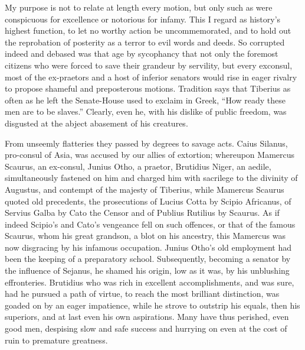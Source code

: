 My purpose is not to relate at length every motion, but only such as were conspicuous for excellence or notorious for infamy. This I regard as history's highest function, to let no worthy action be uncommemorated, and to hold out the reprobation of posterity as a terror to evil words and deeds. So corrupted indeed and debased was that age by sycophancy that not only the foremost citizens who were forced to save their grandeur by servility, but every exconsul, most of the ex-praetors and a host of inferior senators would rise in eager rivalry to propose shameful and preposterous motions. Tradition says that Tiberius as often as he left the Senate-House used to exclaim in Greek, ``How ready these men are to be slaves.'' Clearly, even he, with his dislike of public freedom, was disgusted at the abject abasement of his creatures.


From unseemly flatteries they passed by degrees to savage acts. Caius Silanus, pro-consul of Asia, was accused by our allies of extortion; whereupon Mamercus Scaurus, an ex-consul, Junius Otho, a praetor, Brutidius Niger, an aedile, simultaneously fastened on him and charged him with sacrilege to the divinity of Augustus, and contempt of the majesty of Tiberius, while Mamercus Scaurus quoted old precedents, the prosecutions of Lucius Cotta by Scipio Africanus, of Servius Galba by Cato the Censor and of Publius Rutilius by Scaurus. As if indeed Scipio's and Cato's vengeance fell on such offences, or that of the famous Scaurus, whom his great grandson, a blot on his ancestry, this Mamercus was now disgracing by his infamous occupation. Junius Otho's old employment had been the keeping of a preparatory school. Subsequently, becoming a senator by the influence of Sejanus, he shamed his origin, low as it was, by his unblushing effronteries. Brutidius who was rich in excellent accomplishments, and was sure, had he pursued a path of virtue, to reach the most brilliant distinction, was goaded on by an eager impatience, while he strove to outstrip his equals, then his superiors, and at last even his own aspirations. Many have thus perished, even good men, despising slow and safe success and hurrying on even at the cost of ruin to premature greatness.


